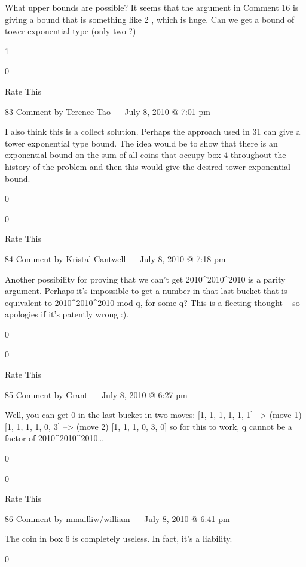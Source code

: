 {        What upper bounds are possible? It seems that the argument in
        Comment 16 is giving a bound that is something like 2 \uparrow
        \uparrow \uparrow {}, which is huge. Can we get a
        bound of tower-exponential type (only two \uparrows?)
         
        1
         
        0
         
        Rate This

        83 Comment by Terence Tao — July 8, 2010 @ 7:01 pm

            I also think this is a collect solution. Perhaps the
            approach used in 31 can give a tower exponential type
            bound. The idea would be to show that there is an
            exponential bound on the sum of all coins that occupy box
            4 throughout the history of the problem and then this
            would give the desired tower exponential bound.
             
            0
             
            0
             
            Rate This

            84 Comment by Kristal Cantwell — July 8, 2010 @ 7:18 pm

    Another possibility for proving that we can’t get 2010^2010^2010
    is a parity argument. Perhaps it’s impossible to get a number in
    that last bucket that is equivalent to 2010^2010^2010 mod q, for
    some q? This is a fleeting thought – so apologies if it’s patently
    wrong :).
     
    0
     
    0
     
    Rate This

    85 Comment by Grant — July 8, 2010 @ 6:27 pm

        Well, you can get 0 in the last bucket in two moves:
        [1, 1, 1, 1, 1, 1] –> (move 1) [1, 1, 1, 1, 0, 3] –> (move 2) [1, 1, 1, 0, 3, 0] so for this to work, q cannot be a factor of 2010^2010^2010…
         
        0
         
        0
         
        Rate This

        86 Comment by mmailliw/william — July 8, 2010 @ 6:41 pm

    The coin in box 6 is completely useless. In fact, it’s a liability.
     
    0
     
}
